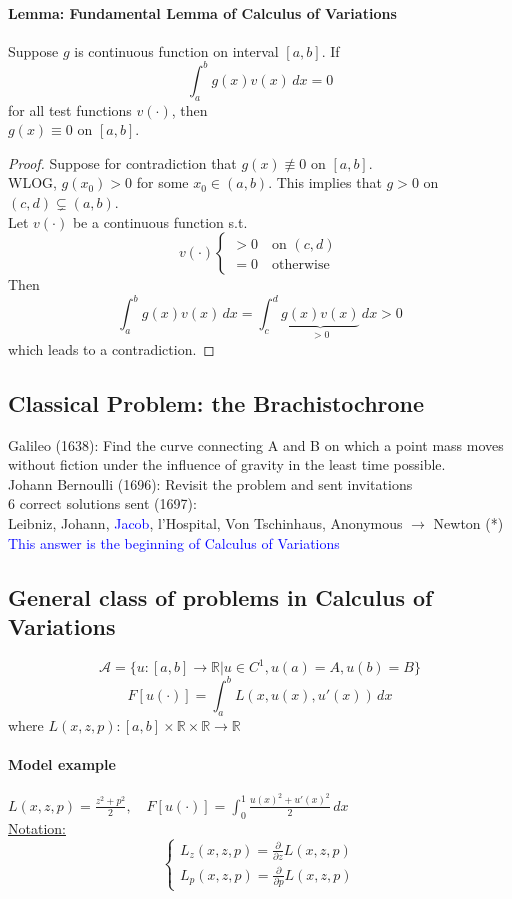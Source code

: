 \documentclass[11pt]{article}
\newcommand{\mc}[1]{\mathcal{#1}}
\newcommand{\real}[0]{\mathbb{R}}
\newcommand{\under}[1]{\underline{#1}}
\begin{document}
\paragraph{Lemma: Fundamental Lemma of Calculus of Variations}
Suppose $g$ is continuous function on interval $[a,b]$. If
$$\int_a^b g(x)v(x) \, dx = 0$$ for all test functions $v(\cdot)$, then \\
$g(x) \equiv 0$ on $[a,b]$.\\
\begin{proof}
	Suppose for contradiction that $g(x) \not\equiv 0$ on $[a, b]$. \\
	WLOG, $g(x_0) > 0$ for some $x_0 \in (a,b)$. This implies that $g > 0$ on $(c, d) \subsetneq (a,b)$. \\
	Let $v(\cdot)$ be a continuous function s.t. 
	$$ v(\cdot) \begin{cases}
		> 0 \quad \text{on $(c,d)$} \\
		= 0 \quad \text{otherwise}
	\end{cases}$$
	Then
	$$\int_a^b g(x)v(x)\, dx = \int_c^d \underbrace{g(x) v(x)}_{>0} \, dx >0$$ which leads to a contradiction.
\end{proof}

\subsection{Classical Problem: the Brachistochrone}
Galileo (1638): Find the curve connecting A and B on which a point mass moves without fiction under the influence of gravity in the least time possible.\\
Johann Bernoulli (1696): Revisit the problem and sent invitations \\
6 correct solutions sent (1697): \\
Leibniz, Johann, \textcolor{blue}{Jacob}, l'Hospital, Von Tschinhaus, Anonymous $\rightarrow$ Newton (*)\\
\textcolor{blue}{This answer is the beginning of Calculus of Variations}


\subsection{General class of problems in Calculus of Variations}
$$\mc{A} = \{ u: [a,b] \rightarrow \real | u \in C^1, u(a) = A, u(b) = B\}$$
$$F[u(\cdot)] = \int_a^b L(x,u(x),u'(x))\,dx$$ 
where $L(x,z,p):[a,b] \times \real \times \real \rightarrow \real$

\paragraph{Model example}
$L(x, z, p) = \frac{z^2 + p^2}{2}, \quad F[u(\cdot)] = \int_0^1 \frac{u(x)^2 + u'(x)^2}{2} \, dx$\\
\under{Notation:} 
$$\begin{cases}
	L_z (x,z,p) = \frac{\partial}{\partial z} L(x,z,p) \\
	L_p (x,z,p) = \frac{\partial}{\partial p} L(x,z,p)
\end{cases}$$
\end{document}
